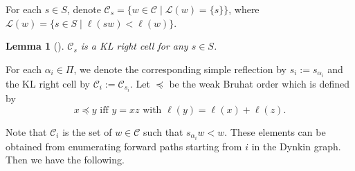 \documentclass[11pt, reqno]{amsart}
\newtheorem{cor}[Thm]{Corollary}
\newtheorem{lem}[Thm]{Lemma}
\theoremstyle{definition}
\numberwithin{equation}{section}
\begin{document}


For each $s\in S$, denote $\mathcal{C}_s=\{w\in \mathcal{C}\mid \mathcal{L}(w)=\{s\}\}$, where $\mathcal{L}(w)=\{s\in S\mid \ell(sw)< \ell(w)\}$.



\begin{lem}[{\cite[\S 3.5]{Lus83}}]
$\mathcal{C}_s$ is a KL right cell for any $s\in S$.
    
\end{lem}

For each $\alpha_i\in \Pi$, we denote the corresponding simple reflection by $s_i:=s_{\alpha_i}$ and the KL right cell by $\mathcal{C}_i:=\mathcal{C}_{s_i}$. Let $ \preceq $ be the weak Bruhat order which is defined by \[
x\preceq y\text{ iff } y=xz \text{ with }\ell(y)=\ell(x)+\ell(z).
\]

Note that $\mathcal{C}_i  $ is the set of $ w\in \mathcal{C} $ such that $ s_{\alpha_i} w<w $. These elements can be obtained  from enumerating forward paths starting from $ i $ in the Dynkin graph.
Then we have the following.
\end{document}
